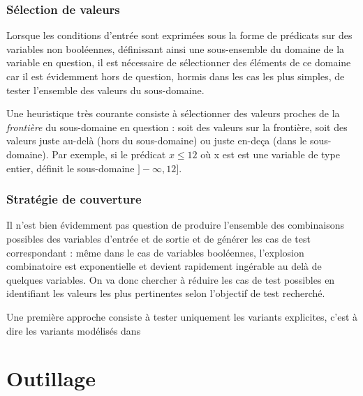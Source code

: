 \par
  
\subsubsection{S\'election de valeurs}
  
     Lorsque les conditions d'entr\'ee sont exprim\'ees sous la forme de
     pr\'edicats sur des variables non bool\'eennes, d\'efinissant ainsi une
     sous-ensemble du domaine de la variable en question, il est
     n\'ecessaire de s\'electionner des \'el\'ements de ce domaine car il est
     \'evidemment hors de question, hormis dans les cas les plus
     simples, de tester l'ensemble des valeurs du sous-domaine.
   
\par
  Une heuristique tr\`es courante consiste \`a s\'electionner des
    valeurs proches de la 
\emph{fronti\`ere}
   du sous-domaine en
    question : soit des valeurs sur la fronti\`ere, soit des valeurs
    juste au-del\`a (hors du sous-domaine) ou juste en-de\c{c}a (dans le
    sous-domaine). Par exemple, si le pr\'edicat $x
    \leq 12$ o\`u x est est une variable de type entier, d\'efinit
    le sous-domaine $]-\infty,12]$. 
\par
  
\subsubsection{Strat\'egie de couverture}
  
     Il n'est bien \'evidemment pas question de produire l'ensemble
     des combinaisons possibles des variables d'entr\'ee et de sortie et
     de g\'en\'erer les cas de test correspondant : m\^eme dans le cas de
     variables bool\'eennes, l'explosion combinatoire est exponentielle
     et devient rapidement ing\'erable au del\`a de quelques variables. On
     va donc chercher \`a r\'eduire les cas de test possibles en
     identifiant les valeurs les plus pertinentes selon l'objectif de
     test recherch\'e. 
    
\par
  
     Une premi\`ere approche consiste \`a tester uniquement les variants
     explicites, c'est \`a dire les variants mod\'elis\'es dans
    
\par
  
\section{Outillage}
  

